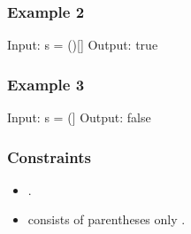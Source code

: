 \documentclass[letterpaper,12pt,english]{book}
\begin{document}
\subsubsection{Example 2}
\label{\detokenize{Stack/20_Valid_Parentheses:example-2}}
\begin{sphinxVerbatim}[commandchars=\\\{\}]
Input: s = \PYGZdq{}()[]\PYGZob{}\PYGZcb{}\PYGZdq{}
Output: true
\end{sphinxVerbatim}


\subsubsection{Example 3}
\label{\detokenize{Stack/20_Valid_Parentheses:example-3}}
\begin{sphinxVerbatim}[commandchars=\\\{\}]
Input: s = \PYGZdq{}(]\PYGZdq{}
Output: false
\end{sphinxVerbatim}


\subsubsection{Constraints}
\label{\detokenize{Stack/20_Valid_Parentheses:constraints}}\begin{itemize}
\item {} 
\sphinxAtStartPar
{}.

\item {} 
\sphinxAtStartPar
{} consists of parentheses only \sphinxcode{\sphinxupquote{\textquotesingle{}(){[}{]}\{\}\textquotesingle{}}}.

\end{itemize}
\end{document}
